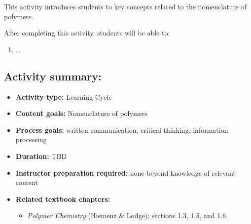 %
%
%
%

\renewcommand{\figpath}{content/intro/nomenclature/figs}
\renewcommand{\labelbase}{nomenclature}

\begin{activity}

\begin{instructornotes}

	This activity introduces students to key concepts related to the nomenclature of polymers.
	
	After completing this activity, students will be able to:
			\begin{enumerate}
				\item \dots
			\end{enumerate}
			
	\subsection*{Activity summary:}
	\begin{itemize}
		\item \textbf{Activity type:} Learning Cycle
		\item \textbf{Content goals:} Nomenclature of polymers
		\item \textbf{Process goals:} %
			written communication, critical thinking, information processing
		\item \textbf{Duration:} TBD
		\item \textbf{Instructor preparation required:} none beyond knowledge of relevant content
		\item \textbf{Related textbook chapters:}
			\begin{itemize}
				\item \emph{Polymer Chemistry} (Hiemenz \& Lodge): sections 1.3, 1.5, and 1.6
			\end{itemize}
	\end{itemize}


\end{instructornotes}
\end{activity}
